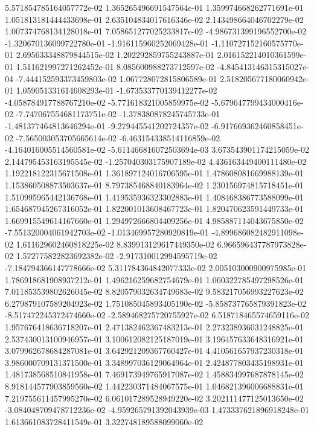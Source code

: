 5.571854785164057772e-02
1.365265496691547564e-01
1.359974668262771691e-01
1.051813181444433698e-01
2.635104834017616346e-02
2.143498664046702279e-02
1.007374768134128018e-01
7.058651277025233817e-02
-4.986731399196552700e-02
-1.320670136099722780e-01
-1.916115960252069428e-01
-1.110727152160575770e-01
2.695633348879844515e-02
1.202292859755243887e-01
2.016152214010361599e-01
1.511621997271262452e-01
8.085600988273712597e-02
-4.845413146315315027e-04
-7.444152593373459803e-02
1.067728072815806589e-01
2.518205677180060942e-01
1.059051331614608293e-01
-1.673533770139412277e-02
-4.058784917788767210e-02
-5.771618321005859975e-02
-5.679647799434000416e-02
-7.747067554681173751e-02
-1.378380878245745733e-01
-1.481377464813646294e-01
-9.279445541202724357e-02
-6.917669362460858451e-02
-7.565003053705665614e-02
-6.463154338514116859e-02
-4.164016005514560581e-02
-5.611466816072503694e-03
3.673543901174215059e-02
2.144795453163195545e-02
-1.257040303175907189e-02
4.436163449400111480e-02
1.192218122315671508e-01
1.361897124016706595e-01
1.478608081669988139e-01
1.153860508873503637e-01
8.797385468840183964e-02
1.230156974815718451e-01
1.510995965442136768e-01
1.419535936323302883e-01
1.408468386773588099e-01
1.654687945267316052e-01
1.822001013608467723e-01
1.820470623591449733e-01
1.669915549614167660e-01
1.294972666804409256e-01
4.985887114043675850e-02
-7.551320004061942703e-02
-1.013469957280920819e-01
-4.899686082482911098e-02
1.611629602460818225e-02
8.839913129617449350e-02
6.966596437787973828e-02
1.572775822823692382e-02
-2.917310012994595719e-02
-7.184794366147778666e-02
5.311784364842077333e-02
2.005103000900975985e-01
1.786918681908937212e-01
1.496216259682754679e-01
1.060322785497298526e-01
7.011853539802626045e-02
8.820579032634749683e-02
9.583217056993227623e-02
6.279879107589204923e-02
1.751085045893405190e-02
-5.858737765879391823e-02
-8.517472245372474660e-02
-2.589468275720755927e-02
6.518718465574659116e-02
1.957676418636718207e-01
2.471382462367483213e-01
2.273238936031248825e-01
2.537430013100946957e-01
3.100612082125187019e-01
3.196457633648316921e-01
3.079962678684287081e-01
3.642921209367760427e-01
4.410561657937230318e-01
3.986000709131371500e-01
3.348997036129064964e-01
2.424877803435198931e-01
1.481738568510841958e-01
7.469173949765917087e-02
1.458834997687878145e-02
8.918144577903859560e-02
1.442230371484067575e-01
1.046821396006688831e-01
7.219755611457995270e-02
6.061017289528949220e-02
3.202111477125013650e-02
-3.084048709478712236e-02
-4.959265791392043939e-03
1.473337621896918248e-01
1.613661083728411549e-01
3.322748189588099060e-02
